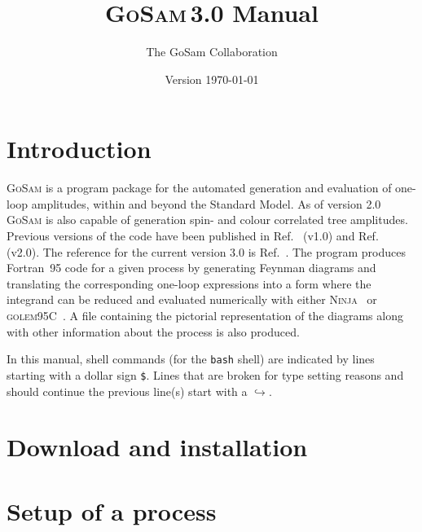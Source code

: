 \documentclass[11pt,a4paper, oneside]{scrbook}
\title{\textsc{GoSam}\,3.0 Manual}
\author{The GoSam Collaboration}
\date{Version \today}
\newcommand{\gosamversion}{{3{.}0}}
\newcommand{\gosamv}[1][\gosamversion]{\textsc{GoSam}\xspace}
\newcommand{\golemVC}{\textsc{golem95C}\xspace}
\newcommand{\fortranXC}{Fortran~95\xspace}
\newcommand{\ninja}{\textsc{Ninja}\xspace}
\newcommand{\contl}{{\ensuremath{\hookrightarrow}}}
\begin{document}
\maketitle
\tableofcontents


\chapter{Introduction}
\gosamv is a program package for the automated generation and evaluation of one-loop amplitudes, within and beyond the Standard Model. As of version 2.0 \gosamv is also capable of generation spin- and colour correlated tree amplitudes. Previous versions of the code have been published in Ref.~\cite{Cullen:2011ac} (v1.0) and Ref.~\cite{Cullen:2014yla} (v2.0). The reference for the current version 3.0 is Ref.~\cite{GoSam3}. The program produces \fortranXC code for a given process
by generating Feynman diagrams and translating
the corresponding one-loop expressions into a form where the integrand
can be reduced and evaluated numerically with either
\ninja~\cite{Mastrolia:2012bu,vanDeurzen:2013saa,Peraro:2014cba}
or \golemVC~\cite{Golem95:2008,Cullen:2011kv,Guillet:2013msa}.
A file containing the pictorial representation of the diagrams along with other information 
about the process is also produced. 

\vspace*{3mm}

In this manual, shell commands 
(for the \texttt{bash} shell) are indicated
by lines starting with a dollar sign \texttt{\$}.
Lines that are broken for type setting reasons and should
continue the previous line(s) start with a \contl.

\chapter{Download and installation}


\chapter{Setup of a process}
\label{chp:setup-of-a-process}

\end{document}
